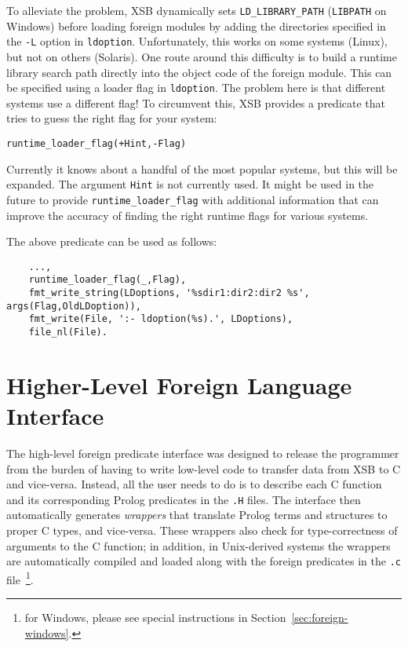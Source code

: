 To alleviate the problem, XSB dynamically sets {\tt LD\_LIBRARY\_PATH}
({\tt LIBPATH} on Windows) before loading foreign modules by adding the
directories specified in the {\tt -L} option in {\tt ldoption}.
Unfortunately, this works on some systems (Linux), but not on others
(Solaris). One route around this difficulty is to build a runtime library
search path directly into the object code of the foreign module. This can
be specified using a loader flag in {\tt ldoption}.  The problem here is
that different systems use a different flag!  To circumvent this, XSB
provides a predicate that tries to guess the right flag for your system:
\begin{verbatim}
runtime_loader_flag(+Hint,-Flag)  
\end{verbatim}
Currently it knows about a handful of the most popular systems, but this
will be expanded. The argument {\tt Hint} is not currently used.
It might be used in the future to provide {\tt runtime\_loader\_flag} with
additional information that can improve the accuracy of finding the right
runtime flags for various systems.

The above predicate can be used as follows:
\begin{verbatim}
    ...,
    runtime_loader_flag(_,Flag),
    fmt_write_string(LDoptions, '%sdir1:dir2:dir2 %s', args(Flag,OldLDoption)),
    fmt_write(File, ':- ldoption(%s).', LDoptions),
    file_nl(File).
\end{verbatim}

\section{Higher-Level Foreign Language Interface}

The high-level foreign predicate interface was designed to release the
programmer from the burden of having to write low-level code to
transfer data from XSB to C and vice-versa.  Instead, all the user
needs to do is to describe each C function and its corresponding
Prolog predicates in the {\tt .H} files. The interface then
automatically generates \emph{wrappers} that translate Prolog terms
and structures to proper C types, and vice-versa.  These wrappers also
check for type-correctness of arguments to the C function; in
addition, in Unix-derived systems the wrappers are automatically
compiled and loaded along with the foreign predicates in the {\tt .c}
file~\footnote{for Windows, please see special instructions in
  Section~\ref{sec:foreign-windows}.}.


